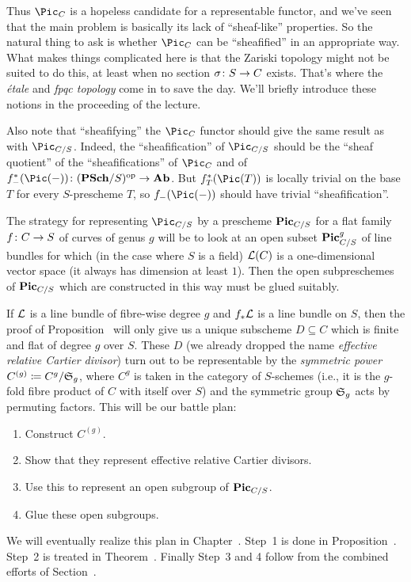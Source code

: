 \documentclass[a4paper,parskip=half,numbers=enddot, DIV=12]{scrreprt}
\begin{document}
Thus $\Pic_C$ is a hopeless candidate for a representable functor, and we've seen that the main problem is basically its lack of ``sheaf-like'' properties. So the natural thing to ask is whether $\Pic_C$ can be ``sheafified'' in an appropriate way. What makes things complicated here is that the Zariski topology might not be suited to do this, at least when no section $\sigma\colon S\morphism C$ exists. That's where the \emph{étale} and \emph{fpqc topology} come in to save the day. We'll briefly introduce these notions in the proceeding of the lecture.

Also note that ``sheafifying'' the $\Pic_C$ functor should give the same result as with $\Pic_{C/S}$. Indeed, the ``sheafification'' of $\Pic_{C/S}$ should be the ``sheaf quotient'' of the ``sheafifications'' of $\Pic_C$ and of $f_-^*(\Pic(-))\colon(\cat{PSch}/S)^\op\morphism\cat{Ab}$. But $f_T^*(\Pic(T))$ is locally trivial on the base $T$ for every $S$-prescheme $T$, so $f_-(\Pic(-))$ should have trivial ``sheafification''.

The strategy for representing $\Pic_{C/S}$ by a prescheme $\mathbf{Pic}_{C/S}$ for a flat family $f\colon C\morphism S$ of curves of genus $g$ will be to look at an open subset $\mathbf{Pic}_{C/S}^g$ of line bundles for which (in the case where $S$ is a field) $\mathcal{L}(C)$ is a one-dimensional vector space (it always has dimension at least $1$). Then the open subpreschemes of $\mathbf{Pic}_{C/S}$ which are constructed in this way must be glued suitably.

If $\mathcal{L}$ is a line bundle of fibre-wise degree $g$ and $f_*\mathcal{L}$ is a line bundle on $S$, then the proof of Proposition~ will only give us a unique subscheme $D\subseteq C$ which is finite and flat of degree $g$ over $S$. These $D$ (we already dropped the name \emph{effective relative Cartier divisor}) turn out to be representable by the \emph{symmetric power} $C^{(g)}\coloneqq C^{g}/\mathfrak{S}_g$, where $C^{g}$ is taken in the category of $S$-schemes (i.e., it is the $g$-fold fibre product of $C$ with itself over $S$) and the symmetric group $\mathfrak{S}_g$ acts by permuting factors. This will be our battle plan:
\begin{enumerate}
	\item Construct $C^{(g)}$.
	\item Show that they represent effective relative Cartier divisors.
	\item Use this to represent an open subgroup of $\mathbf{Pic}_{C/S}$.
	\item Glue these open subgroups.
\end{enumerate}
We will eventually realize this plan in Chapter~. Step~1 is done in Proposition~. Step~2 is treated in Theorem~. Finally Step~3 and 4 follow from the combined efforts of Section~.
\end{document}
